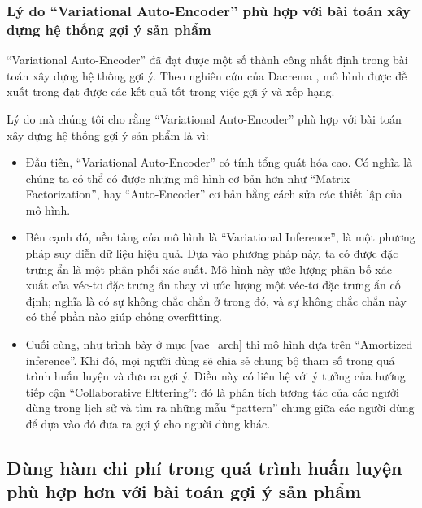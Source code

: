     \subsubsection{Lý do ``Variational Auto-Encoder'' phù hợp với bài toán xây dựng hệ thống gợi ý sản phẩm}\label{why_vae}


    
    ``Variational Auto-Encoder'' đã đạt được một số thành công nhất định trong bài toán xây dựng hệ thống gợi ý. 
    Theo nghiên cứu của Dacrema \cite{dacrema2019we}, mô hình được đề xuất trong \cite{mvae} đạt được các kết quả tốt trong việc gợi ý và xếp hạng. 

    Lý do mà chúng tôi cho rằng ``Variational Auto-Encoder'' phù hợp với bài toán xây dựng hệ thống gợi ý sản phẩm là vì: 
    \begin{itemize}
        \item Đầu tiên, ``Variational Auto-Encoder'' có tính tổng quát hóa cao. Có nghĩa là chúng ta có thể có được những mô hình cơ bản hơn như ``Matrix Factorization'', hay ``Auto-Encoder'' cơ bản bằng cách sửa các thiết lập của mô hình. 
        \item Bên cạnh đó, nền tảng của mô hình là ``Variational Inference'', là một phương pháp suy diễn dữ liệu hiệu quả. Dựa vào phương pháp này, ta có được đặc trưng ẩn là một phân phối xác suất. Mô hình này ước lượng phân bố xác xuất của véc-tơ đặc trưng ẩn thay vì ước lượng một véc-tơ đặc trưng ẩn cố định; nghĩa là có sự không chắc chắn ở trong đó, và sự không chắc chắn này có thể phần nào giúp chống overfitting.
        \item Cuối cùng, như trình bày ở mục \ref{vae_arch} thì mô hình dựa trên ``Amortized inference''. Khi đó, mọi người dùng sẽ chia sẻ chung bộ tham số trong quá trình huấn luyện và đưa ra gợi ý. Điều này có liên hệ với ý tưởng của hướng tiếp cận ``Collaborative filttering'': đó là phân tích tương tác của các người dùng trong lịch sử và tìm ra những mẫu ``pattern'' chung giữa các người dùng để dựa vào đó đưa ra gợi ý cho người dùng khác.
    \end{itemize}
    \subsection{Dùng hàm chi phí trong quá trình huấn luyện phù hợp hơn với bài toán gợi ý sản phẩm}



